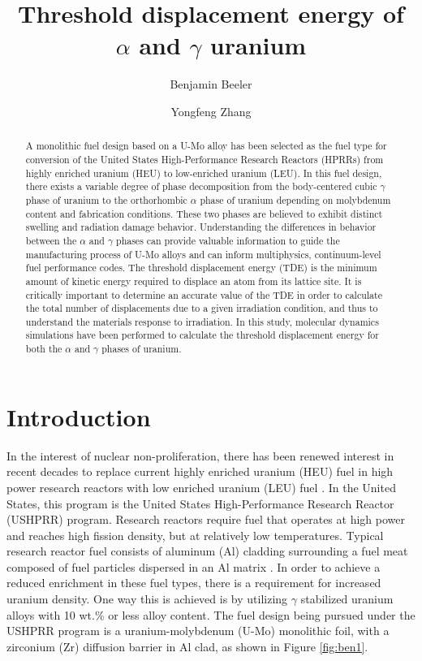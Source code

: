 \documentclass[review]{elsarticle}
\begin{document}
\begin{frontmatter}
\title{Threshold displacement energy of $\alpha$ and $\gamma$ uranium}

\author[inl]{Benjamin Beeler}
\author[inl]{Yongfeng Zhang}
\address[inl]{Idaho National Laboratory, Idaho Falls, ID 83415}

\begin{abstract}
A monolithic fuel design based on a U-Mo alloy has been selected as the fuel type for conversion of the United States High-Performance Research Reactors (HPRRs) from highly enriched uranium (HEU) to low-enriched uranium (LEU). In this fuel design, there exists a variable degree of phase decomposition from the body-centered cubic $\gamma$ phase of uranium to the orthorhombic $\alpha$ phase of uranium depending on molybdenum content and fabrication conditions. These two phases are believed to exhibit distinct swelling and radiation damage behavior. Understanding the differences in behavior between the $\alpha$ and $\gamma$ phases can provide valuable information to guide the manufacturing process of U-Mo alloys and can inform multiphysics, continuum-level fuel performance codes. The threshold displacement energy (TDE) is the minimum amount of kinetic energy required to displace an atom from its lattice site. It is critically important to determine an accurate value of the TDE in order to calculate the total number of displacements due to a given irradiation condition, and thus to understand the materials response to irradiation. In this study, molecular dynamics simulations have been performed to calculate the threshold displacement energy for both the $\alpha$ and $\gamma$ phases of uranium. 
\end{abstract}
\end{frontmatter}


\section{Introduction}

In the interest of nuclear non-proliferation, there has been renewed interest in recent decades to replace current highly enriched uranium (HEU) fuel in high power research reactors with low enriched uranium (LEU) fuel \cite{snelgrove1997}. In the United States, this program is the United States High-Performance Research Reactor (USHPRR) program. Research reactors require fuel that operates at high power and reaches high fission density, but at relatively low temperatures. Typical research reactor fuel consists of aluminum (Al) cladding surrounding a fuel meat composed of fuel particles dispersed in an Al matrix \cite{meyer2014}. In order to achieve a reduced enrichment in these fuel types, there is a requirement for increased uranium density. One way this is achieved is by utilizing $\gamma$ stabilized uranium alloys with 10 wt.\% or less alloy content. The fuel design being pursued under the USHPRR program is a uranium-molybdenum (U-Mo) monolithic foil, with a zirconium (Zr) diffusion barrier in Al clad, as shown in Figure \ref{fig:ben1}. 
\end{document}
